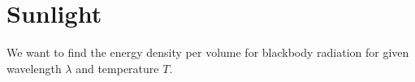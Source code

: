 \documentclass[../../PS3.tex]{subfiles}
\begin{document}
\section{Sunlight}

We want to find the energy density per volume for blackbody radiation for given wavelength $\lambda$ and temperature $T$.
\end{document}
